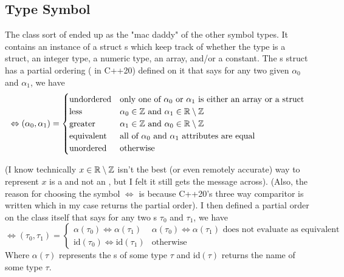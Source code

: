 \documentclass{article}
\begin{document}
\subsection{Type Symbol}
\label{symbol:typesymbol}
The  class sort of ended up as the "mac daddy" of the other symbol types.
It contains an instance of a struct s which keep track of whether the type is a struct, an integer type, a numeric type, an array, and/or a constant.
The s struct has a partial ordering ( in C++20) defined on it that says for any two given  $\alpha_0$ and $\alpha_1$, we have
\begin{equation*}
    \Leftrightarrow (\alpha_0,\alpha_1) = 
    \begin{cases}
        \text{undordered} & \text{only one of $\alpha_0$ or $\alpha_1$ is either an array or a struct} \\
        \text{less} & \alpha_0\in\mathbb{Z} \text{ and } \alpha_1\in\mathbb{R}\setminus\mathbb{Z} \\
        \text{greater} & \alpha_1\in\mathbb{Z} \text{ and } \alpha_0\in\mathbb{R}\setminus\mathbb{Z} \\
        \text{equivalent} & \text{all of $\alpha_0$ and $\alpha_1$ attributes are equal} \\
        \text{unordered} & \text{otherwise}
    \end{cases}
\end{equation*}

(I know technically $x\in\mathbb{R}\setminus\mathbb{Z}$ isn't the best (or even remotely accurate) way to represent $x$ is a  and not an , but I felt it still gets the message across).
(Also, the reason for choosing the symbol $\Leftrightarrow$ is because C++20's three way comparitor is written \code{<=>} which in my case returns the partial order).
I then defined a partial order on the  class itself that says for any two s $\tau_0$ and $\tau_1$, we have
\begin{equation*}
    \Leftrightarrow (\tau_0, \tau_1) =
    \begin{cases}
        \alpha(\tau_0) \Leftrightarrow \alpha(\tau_1) & \alpha(\tau_0) \Leftrightarrow \alpha(\tau_1) \text{ does not evaluate as equivalent} \\
        \text{id}(\tau_0) \Leftrightarrow \text{id}(\tau_1) & \text{otherwise}
    \end{cases}
\end{equation*}
Where $\alpha(\tau)$ represents the s of some type $\tau$ and id$(\tau)$ returns the name of some type $\tau$.
\end{document}
